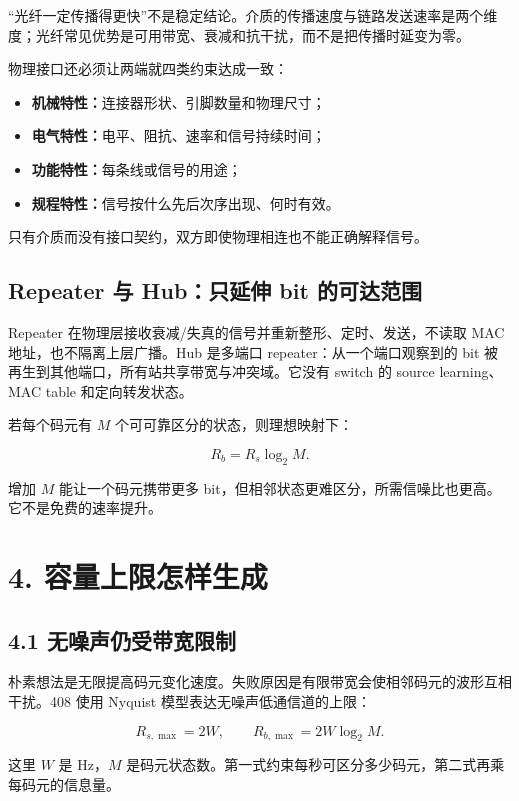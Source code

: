\documentclass[UTF8,fontset=none,11pt,a4paper]{ctexart}
\providecommand{\tightlist}{\setlength{\itemsep}{0pt}\setlength{\parskip}{0pt}}
\begin{document}
“光纤一定传播得更快”不是稳定结论。介质的传播速度与链路发送速率是两个维度；光纤常见优势是可用带宽、衰减和抗干扰，而不是把传播时延变为零。

物理接口还必须让两端就四类约束达成一致：

\begin{itemize}
\tightlist
\item \textbf{机械特性：}连接器形状、引脚数量和物理尺寸；
\item \textbf{电气特性：}电平、阻抗、速率和信号持续时间；
\item \textbf{功能特性：}每条线或信号的用途；
\item \textbf{规程特性：}信号按什么先后次序出现、何时有效。
\end{itemize}

只有介质而没有接口契约，双方即使物理相连也不能正确解释信号。

\subsection{Repeater 与 Hub：只延伸 bit 的可达范围}

Repeater 在物理层接收衰减/失真的信号并重新整形、定时、发送，不读取 MAC 地址，也不隔离上层广播。Hub 是多端口 repeater：从一个端口观察到的 bit 被再生到其他端口，所有站共享带宽与冲突域。它没有 switch 的 source learning、MAC table 和定向转发状态。

若每个码元有 \(M\) 个可可靠区分的状态，则理想映射下：

\[
R_b=R_s\log_2 M.
\]

增加 \(M\) 能让一个码元携带更多
bit，但相邻状态更难区分，所需信噪比也更高。它不是免费的速率提升。

\section{4.
容量上限怎样生成}\label{3-ux5bb9ux91cfux4e0aux9650ux600eux6837ux751fux6210}

\subsection{4.1
无噪声仍受带宽限制}\label{31-ux65e0ux566aux58f0ux4ecdux53d7ux5e26ux5bbdux9650ux5236}

朴素想法是无限提高码元变化速度。失败原因是有限带宽会使相邻码元的波形互相干扰。408
使用 Nyquist 模型表达无噪声低通信道的上限：

\[
R_{s,\max}=2W,
\qquad
R_{b,\max}=2W\log_2M.
\]

这里 \(W\) 是 Hz，\(M\)
是码元状态数。第一式约束每秒可区分多少码元，第二式再乘每码元的信息量。
\end{document}

